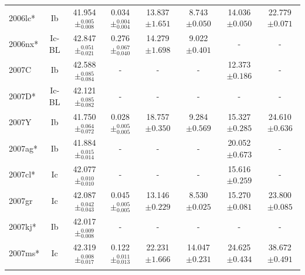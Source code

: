 \documentclass[a4paper,fleqn,usenatbib]{mnras}
\begin{document}
\begin{table}
\begin{minipage}{160mm}
\begin{tabular}{lccccccc}
2006lc* & Ib & 41.954$\pm^{0.005}_{0.008}$ & 0.034$\pm^{0.004}_{0.004}$ & 13.837$\pm{1.651}$ & 8.743$\pm 0.050$ & 14.036$\pm 0.050$ & 22.779$\pm 0.071$\\
2006nx* & Ic-BL & 42.847$\pm^{0.051}_{0.021}$ & 0.276$\pm^{0.067}_{0.040}$ & 14.279$\pm{1.698}$ & 9.022$\pm 0.401$ & - & -\\
2007C & Ib & 42.588$\pm^{0.085}_{0.084}$ & - & - & - & 12.373$\pm 0.186$ & -\\
2007D* & Ic-BL & 42.121$\pm^{0.085}_{0.082}$ & - & - & - & - & -\\
2007Y & Ib & 41.750$\pm^{0.064}_{0.072}$ & 0.028$\pm^{0.005}_{0.005}$ & 18.757$\pm{0.350}$ & 9.284$\pm 0.569$ & 15.327$\pm 0.285$ & 24.610$\pm 0.636$\\
2007ag* & Ib & 41.884$\pm^{0.015}_{0.014}$ & - & - & - & 20.052$\pm 0.673$ & -\\
2007cl* & Ic & 42.077$\pm^{0.010}_{0.010}$ & - & - & - & 15.616$\pm 0.259$ & -\\
2007gr & Ic & 42.087$\pm^{0.042}_{0.043}$ & 0.045$\pm^{0.005}_{0.005}$ & 13.146$\pm{0.229}$ & 8.530$\pm 0.025$ & 15.270$\pm 0.081$ & 23.800$\pm 0.085$\\
2007kj* & Ib & 42.017$\pm^{0.009}_{0.008}$ & - & - & - & - & -\\
2007ms* & Ic & 42.319$\pm^{0.008}_{0.017}$ & 0.122$\pm^{0.011}_{0.013}$ & 22.231$\pm{1.666}$ & 14.047$\pm 0.231$ & 24.625$\pm 0.434$ & 38.672$\pm 0.491$\\


\hline
 \label{BVRIstats}
\end{tabular}
\end{minipage}
\end{table}
\end{document}
